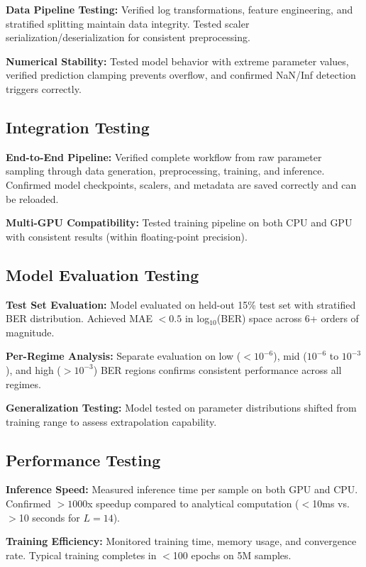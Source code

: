 \documentclass[a4paper,12pt]{report}
\begin{document}
\textbf{Data Pipeline Testing:} Verified log transformations, feature engineering, and stratified splitting maintain data integrity. Tested scaler serialization/deserialization for consistent preprocessing.

\textbf{Numerical Stability:} Tested model behavior with extreme parameter values, verified prediction clamping prevents overflow, and confirmed NaN/Inf detection triggers correctly.

\subsection{Integration Testing}

\textbf{End-to-End Pipeline:} Verified complete workflow from raw parameter sampling through data generation, preprocessing, training, and inference. Confirmed model checkpoints, scalers, and metadata are saved correctly and can be reloaded.

\textbf{Multi-GPU Compatibility:} Tested training pipeline on both CPU and GPU with consistent results (within floating-point precision).

\subsection{Model Evaluation Testing}

\textbf{Test Set Evaluation:} Model evaluated on held-out 15\% test set with stratified BER distribution. Achieved MAE $< 0.5$ in log$_{10}$(BER) space across 6+ orders of magnitude.

\textbf{Per-Regime Analysis:} Separate evaluation on low ($< 10^{-6}$), mid ($10^{-6}$ to $10^{-3}$), and high ($> 10^{-3}$) BER regions confirms consistent performance across all regimes.

\textbf{Generalization Testing:} Model tested on parameter distributions shifted from training range to assess extrapolation capability.

\subsection{Performance Testing}

\textbf{Inference Speed:} Measured inference time per sample on both GPU and CPU. Confirmed $>1000$x speedup compared to analytical computation ($<$10ms vs. $>$10 seconds for $L=14$).

\textbf{Training Efficiency:} Monitored training time, memory usage, and convergence rate. Typical training completes in $<$100 epochs on 5M samples.
\end{document}
